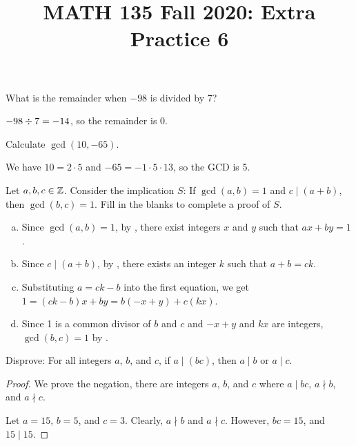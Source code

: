 \documentclass{agony}
\title{MATH 135 Fall 2020: Extra Practice 6}
\begin{document}
\thispagestyle{firstpage}

\textbf{\thetitle}


\question What is the remainder when $-98$ is divided by 7?

$-98 \divisionsymbol 7 = -14$, so the remainder is 0.

\question Calculate $\gcd(10,-65)$.

We have $10 = 2 \cdot 5$ and $-65 = -1 \cdot 5 \cdot 13$, so the GCD is 5.

\question Let $a,b,c\in\mathbb{Z}$. Consider the implication $S$:
If $\gcd(a,b)=1$ and $c \mid (a+b)$, then $\gcd(b,c)=1$.
Fill in the blanks to complete a proof of $S$.
\begin{enumerate}[(a)]
  \setlength{\parskip}{0ex}
  \item Since $\gcd(a,b)=1$, by ,
        there exist integers $x$ and $y$ such that $ax+by=1$.
  \item Since $c \mid (a+b)$, by ,
        there exists an integer $k$ such that $a+b=ck$.
  \item Substituting $a=ck-b$ into the first equation, we get $1=(ck-b)x+by=b(-x+y)+c(kx)$.
  \item Since 1 is a common divisor of $b$ and $c$ and $-x+y$ and $kx$ are integers,
        $\gcd(b,c)=1$ by .
\end{enumerate}

\question Disprove: For all integers $a$, $b$, and $c$, if $a \mid (bc)$, then $a \mid b$ or $a \mid c$.
\begin{proof}
  We prove the negation, there are integers $a$, $b$, and $c$ where
  $a \mid bc$, $a \nmid b$, and $a \nmid c$.

  Let $a=15$, $b=5$, and $c=3$.
  Clearly, $a \nmid b$ and $a \nmid c$.
  However, $bc=15$, and $15 \mid 15$.
\end{proof}


\end{document}
